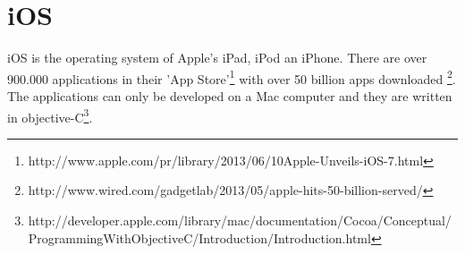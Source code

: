 \section{iOS}
iOS is the operating system of Apple's iPad, iPod an iPhone. There are over 900.000 applications in their 'App Store'\footnote{http://www.apple.com/pr/library/2013/06/10Apple-Unveils-iOS-7.html} with over 50 billion apps downloaded \footnote{http://www.wired.com/gadgetlab/2013/05/apple-hits-50-billion-served/}. The applications can only be developed on a Mac computer and they are written in objective-C\footnote{http://developer.apple.com/library/mac/documentation/Cocoa/Conceptual/ProgrammingWithObjectiveC/Introduction/Introduction.html}.
